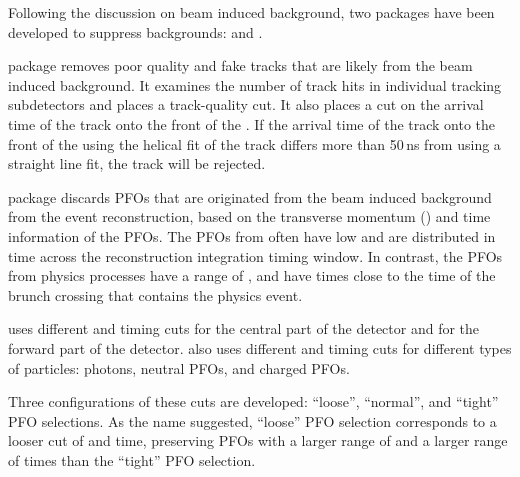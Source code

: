 

Following the discussion on \CLIC beam induced background,  two packages have been developed to suppress \ggHad backgrounds: \TrackSelector and \PFOSelector \cite{Marshall:2012ry}.

\TrackSelector \cite{Marshall:2012ry} package  removes poor quality and fake tracks that are  likely from the beam induced background. It examines the number of track hits in individual tracking subdetectors and places a track-quality cut. It also places a cut on the arrival time of the track onto the front of the \ECAL. If the arrival time of the track onto the front of the \ECAL using the helical fit of the track differs more than 50\,ns from using a straight line fit, the track will be rejected.


\PFOSelector \cite{Marshall:2012ry} package discards PFOs that are originated from the beam induced background from the event reconstruction, based on the transverse momentum (\pT) and time information of the PFOs. The PFOs from \ggHad often have low \pT and are distributed in time across the reconstruction integration timing window. In contrast, the PFOs from physics processes have a range of \pT, and have times close to the time of the brunch crossing that contains the physics event.


 \PFOSelector uses different \pT and timing cuts for the central part of the detector and for the forward part of the detector. \PFOSelector also uses different \pT and timing cuts for different types of particles: photons, neutral PFOs, and charged PFOs.

Three configurations of these cuts are developed: ``loose'', ``normal'', and ``tight'' PFO selections. As the name suggested, ``loose'' PFO selection corresponds to a looser cut of \pT and time, preserving PFOs with a larger range of \pT and a larger range of  times than the ``tight'' PFO selection.


